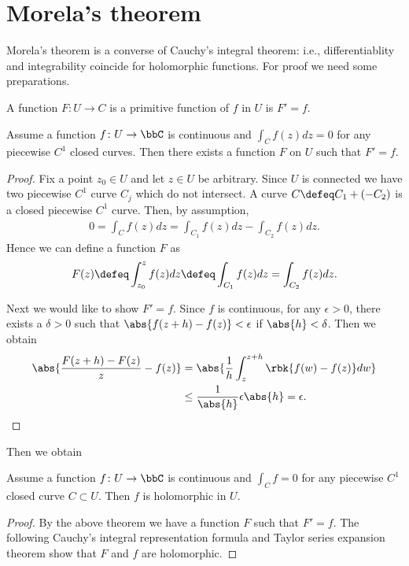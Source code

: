 \documentclass[openany, a4paper, oneside]{jsbook}
\begin{document}
\section{Morela's theorem}

Morela's theorem is a converse of Cauchy's integral theorem:
i.e., differentiablity and integrability coincide for holomorphic functions.
For proof we need some preparations.
\begin{defn}
 A function $F \colon U \to C$ is a primitive function of $f$ in $U$ is $F' = f$.
\end{defn}
\begin{thm}
 Assume a function $f \colon U \to \bbC$ is continuous and $\int_C f (z) dz = 0$ for any piecewise $C^1$ closed curves.
 Then there exists a function $F$ on $U$ such that $F' = f$.
\end{thm}
\begin{proof}
Fix a point $z_0 \in U$ and let $z \in U$ be arbitrary.
Since $U$ is connected we have two piecewise $C^1$ curve $C_j$ which do not intersect.
A curve $C \defeq C_1 + (- C_2)$ is a closed piecewise $C^1$ curve.
Then, by assumption,
\begin{align}
 0
 =
 \int_C f (z) dz
 =
 \int_{C_1} f (z) dz - \int_{C_2} f (z) dz.
\end{align}
Hence we can define a function $F$ as
\begin{align}
 F (z)
 \defeq
 \int_{z_0}^{z} f (z) dz
 \defeq
 \int_{C_1} f (z) dz = \int_{C_2} f (z) dz.
\end{align}

Next we would like to show $F' = f$.
Since $f$ is continuous, for any $\epsilon > 0$, there exists a $\delta > 0$ such that $\abs{f (z+h) - f (z)} < \epsilon$ if $\abs{h} < \delta$.
Then we obtain
 \begin{align}
  \abs{\frac{F (z+h) - F (z)}{z} - f (z)}
  &=
  \abs{\frac{1}{h}\int_{z}^{z+h} \rbk{f (w) - f (z)} dw} \\
  &\leq
  \frac{1}{\abs{h}} \epsilon \abs{h} = \epsilon.
  \end{align}
\end{proof}

Then we obtain
\begin{thm}
 Assume a function $f \colon U \to \bbC$ is continuous and $\int_C f = 0$ for any piecewise $C^1$ closed curve $C \subset U$.
 Then $f$ is holomorphic in $U$.
\end{thm}
\begin{proof}
By the above theorem we have a function $F$ such that $F' = f$.
The following Cauchy's integral representation formula and Taylor series expansion theorem show that $F$ and $f$ are holomorphic.
\end{proof}
\end{document}
